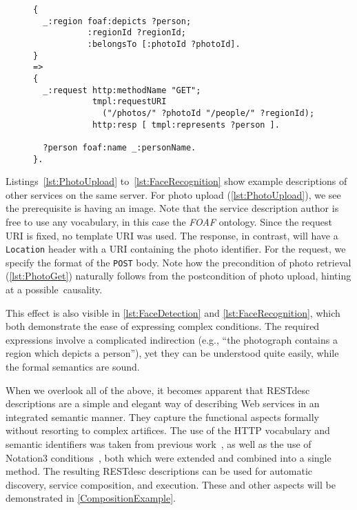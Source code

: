 \documentclass[runningheads,a4paper, twocolumn]{llncs}
\begin{document}
\begin{figure}[float=t!]
\begin{lstlisting}[caption=RESTdesc description of face recognition,
                   label=lst:FaceRecognition, escapechar=§, belowskip=-1em]
{
  _:region foaf:depicts ?person;
           :regionId ?regionId;
           :belongsTo [:photoId ?photoId].
}
=>
{
  _:request http:methodName "GET";
            tmpl:requestURI
              ("/photos/" ?photoId "/people/" ?regionId);
            http:resp [ tmpl:represents ?person ].
  
  ?person foaf:name _:personName.
}.
\end{lstlisting}
\end{figure}

Listings~\ref{lst:PhotoUpload} to~\ref{lst:FaceRecognition} show example descriptions of other services on the same server. For photo upload (\autoref{lst:PhotoUpload}), we see the prerequisite is having an image. Note that the service description author is free to use any vocabulary, in this case the \emph{FOAF} ontology. Since the request URI is fixed, no template URI was used. The response, in contrast, will have a \Verb!Location! header with a URI containing the photo identifier. For the request, we specify the format of the \Verb!POST! body. Note how the precondition of photo retrieval (\autoref{lst:PhotoGet}) naturally follows from the postcondition of photo upload, hinting at a possible~causality.

This effect is also visible in \autoref{lst:FaceDetection} and \autoref{lst:FaceRecognition}, which both demonstrate the ease of expressing complex conditions. The required expressions involve a complicated indirection (e.g., ``the photograph contains a region which depicts a person''), yet they can be understood quite easily, while the formal semantics are sound.

When we overlook all of the above, it becomes apparent that RESTdesc descriptions are a simple and elegant way of describing Web services in an integrated semantic manner. They capture the functional aspects formally without resorting to complex artifices. The use of the HTTP vocabulary and semantic identifiers was taken from previous work~\cite{Steiner:2011p5006}, as well as the use of \mbox{Notation3} conditions~\cite{Verborgh:2010p2746}, both which were extended and combined into a single method. The resulting \mbox{RESTdesc} descriptions can be used for automatic discovery, service composition, and execution. These and other aspects will be demonstrated in \autoref{CompositionExample}.
\end{document}
